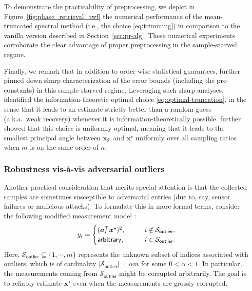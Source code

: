 %

To demonstrate the practicability of preprocessing, we depict in
Figure~\ref{fig:phase_retrieval_twf} the numerical performance of  the mean-truncated spectral method (i.e., the choice \eqref{eq:trimming}) in comparison to the vanilla version described in Section~\ref{sec:pr-alg}.
These numerical experiments corroborate the clear advantage of proper preprocessing in the sample-starved regime.


Finally, we remark that in addition to order-wise statistical guarantees,  \citet{lu2020phase} further pinned down sharp characterization of the error bounds (including the pre-constants) in this sample-starved regime. Leveraging such sharp analyses,  \citet{mondelli2017fundamental} identified the information-theoretic optimal choice \eqref{eq:optimal-truncation}, in the sense that it leads to an estimate strictly better than a random guess (a.k.a.~weak recovery) whenever it is information-theoretically possible. \citet{luo2019optimal} further showed that this choice is uniformly optimal, meaning that it leads to the smallest principal angle between $\bm{x}_{\mathcal{T}}$ and $\bm{x}^{\star}$ uniformly over all sampling ratios when $m$ is on the same order of $n$.




\subsubsection{Robustness vis-\`a-vis adversarial outliers}

Another practical consideration that merits special attention is that
the collected samples are sometimes susceptible to adversarial entries
(due to, say, sensor failures or malicious attacks).
To formulate this in more formal terms, consider the following modified measurement model \citep{zhang2016provable,hand2017phaselift,hand2016corruption}:
%
\begin{equation}
	\label{eq:robust_pr_model}
	y_i = \begin{cases}
	({\boldsymbol a}_i^\top{\boldsymbol x}^{\star})^2, \qquad  & i \notin \mathcal{S}_{\mathsf{outlier}}, \\
		\mathsf{arbitrary} ,\qquad & i \in \mathcal{S}_{\mathsf{outlier}}.
	\end{cases}
\end{equation}
%
Here, $\mathcal{S}_{\mathsf{outlier}} \subseteq \{1,\cdots,m\}$ represents the unknown subset of indices associated with outliers,
which is of cardinality  $|\mathcal{S}_{\mathsf{outlier}}|=\alpha  m$ for some $0<\alpha<1$.
In particular, the  measurements coming from $\mathcal{S}_{\mathsf{outlier}}$ might be corrupted arbitrarily.
The goal is to reliably estimate $\bm{x}^{\star}$ even when the measurements are grossly corrupted.





